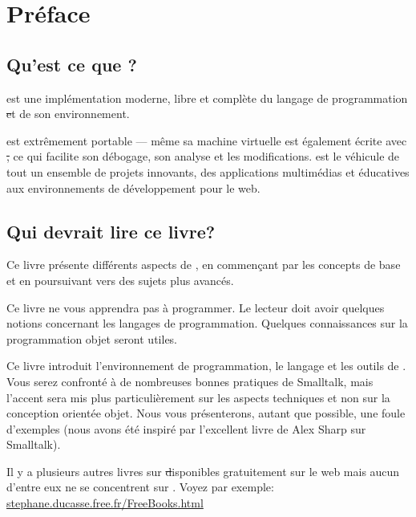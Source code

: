 \documentclass[a4paper,10pt,twoside]{book}
\begin{document}
\fi
\renewcommand{\nnbb}[2]{} %
\sloppy
\chapter{Pr\'eface}\label{cha:intro}

\section*{Qu'est ce que \sq?}

\sq est une impl\'ementation moderne, libre et compl\`ete du langage de programmation \st et de son environnement.

\sq est extr\^emement portable --- m\^eme sa machine virtuelle est \'egalement \'ecrite avec \st, ce qui facilite son d\'ebogage, son analyse et les modifications. \sq est le v\'ehicule de tout un ensemble de projets innovants, des applications multim\'edias et \'educatives aux environnements de d\'eveloppement pour le web.

\section*{Qui devrait lire ce livre?}

Ce livre pr\'esente diff\'erents aspects de \sq, en commen\c{c}ant par les concepts de base et en poursuivant vers des sujets plus avanc\'es.

Ce livre ne vous apprendra pas \`a programmer. Le lecteur doit avoir quelques notions concernant les langages de programmation. Quelques connaissances sur la programmation objet seront utiles.

Ce livre introduit l'environnement de programmation, le langage et
les outils de \sq. Vous serez confront\'e \`a de nombreuses bonnes
pratiques de Smalltalk, mais l'accent sera mis plus particuli\`erement
sur les aspects techniques et non sur la conception orient\'ee
objet. Nous vous pr\'esenterons, autant que possible, une foule 
d'exemples (nous avons \'et\'e inspir\'e par l'excellent livre de Alex
Sharp sur Smalltalk\cite{Shar97a}).

Il y a plusieurs autres livres sur \st disponibles gratuitement sur le web mais aucun d'entre eux ne se concentrent sur \sq. Voyez par exemple:
\url{stephane.ducasse.free.fr/FreeBooks.html}
\end{document}
